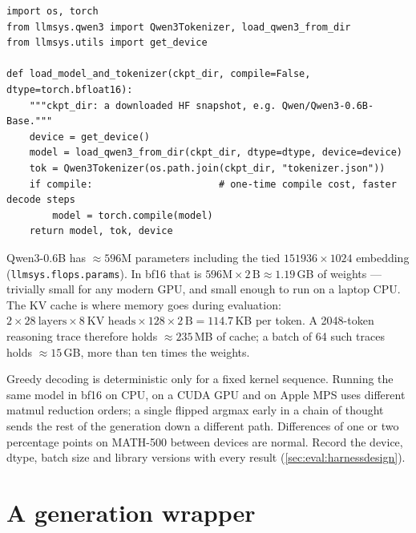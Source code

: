 \begin{lstlisting}[caption={Loading the model under test (see \texttt{labs/lab17\_eval/run.py}).},label={lst:eval:load}]
import os, torch
from llmsys.qwen3 import Qwen3Tokenizer, load_qwen3_from_dir
from llmsys.utils import get_device

def load_model_and_tokenizer(ckpt_dir, compile=False, dtype=torch.bfloat16):
    """ckpt_dir: a downloaded HF snapshot, e.g. Qwen/Qwen3-0.6B-Base."""
    device = get_device()
    model = load_qwen3_from_dir(ckpt_dir, dtype=dtype, device=device)
    tok = Qwen3Tokenizer(os.path.join(ckpt_dir, "tokenizer.json"))
    if compile:                      # one-time compile cost, faster decode steps
        model = torch.compile(model)
    return model, tok, device
\end{lstlisting}

\begin{napkinmath}
Qwen3-0.6B has $\approx\num{596}$M parameters including the tied $\num{151936}\times1024$
embedding (\texttt{llmsys.flops.params}). In bf16 that is $596\text{M}\times 2\,\text{B}
\approx 1.19$\,GB of weights --- trivially small for any modern GPU, and small enough to run on a
laptop CPU. The KV cache is where memory goes during evaluation: $2 \times 28\ \text{layers}
\times 8\ \text{KV heads} \times 128 \times 2\,\text{B} = 114.7$\,KB per token. A 2048-token
reasoning trace therefore holds $\approx 235$\,MB of cache; a batch of 64 such traces holds
$\approx 15$\,GB, more than ten times the weights.
\end{napkinmath}

\begin{pitfall}
Greedy decoding is deterministic only for a fixed kernel sequence. Running the same model in bf16
on CPU, on a CUDA GPU and on Apple MPS uses different matmul reduction orders; a single flipped
argmax early in a chain of thought sends the rest of the generation down a different path.
Differences of one or two percentage points on MATH-500 between devices are normal. Record the
device, dtype, batch size and library versions with every result
(\cref{sec:eval:harnessdesign}).
\end{pitfall}

\section{A generation wrapper}\label{sec:eval:wrapper}


